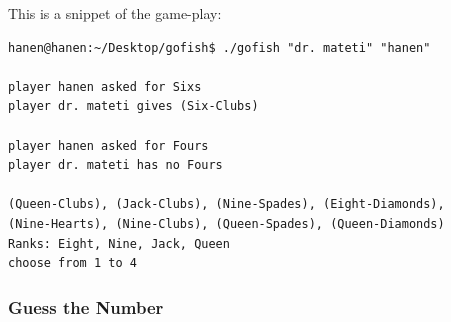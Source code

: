 \documentclass{article}
\begin{document}
\begin{enumerate}
This is a snippet of the game-play:
\begin{verbatim}
hanen@hanen:~/Desktop/gofish$ ./gofish "dr. mateti" "hanen"

player hanen asked for Sixs
player dr. mateti gives (Six-Clubs)

player hanen asked for Fours
player dr. mateti has no Fours

(Queen-Clubs), (Jack-Clubs), (Nine-Spades), (Eight-Diamonds), 
(Nine-Hearts), (Nine-Clubs), (Queen-Spades), (Queen-Diamonds)
Ranks: Eight, Nine, Jack, Queen
choose from 1 to 4
\end{verbatim}
\end{enumerate}

\subsubsection{Guess the Number}
\end{document}
